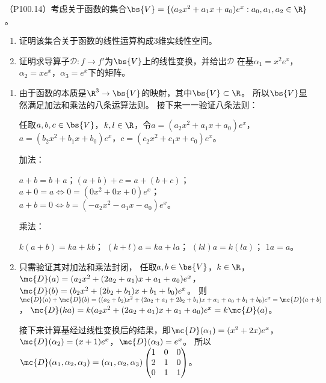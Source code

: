 \documentclass[12pt, a4paper, oneside, UTF8]{ctexbook}
\begin{document}
\begin{question}
    （P100.14）考虑关于函数的集合$\bs{V}=\{(a_2x^2+a_1x+a_0)e^x:a_0,a_1,a_2 \in \R\}$。
   \begin{enumerate}[label=(\arabic*)]
    \item 证明该集合关于函数的线性运算构成3维实线性空间。
    \item 证明求导算子$\mathcal{D}: f \rightarrow f'$为$\bs{V}$上的线性变换，并给出$\mathcal{D}$
    在基$\alpha_1=x^2e^x$，$\alpha_2=xe^x$，$\alpha_3=e^x$下的矩阵。
\end{enumerate}
\end{question}

\begin{solution}
    \begin{enumerate}[label=(\arabic*)]
        \item 由于函数的本质是$\R^3 \to \bs{V}$的映射，其中$\bs{V} \subset \R$。
        所以$\bs{V}$显然满足加法和乘法的八条运算法则。
        接下来一一验证八条法则：

        任取$a,b,c \in \bs{V}$，$k,l \in \R$，令$a=(a_2x^2+a_1x+a_0)e^x$，$a=(b_2x^2+b_1x+b_0)e^x$，$c=(c_2x^2+c_1x+c_0)e^x$。
        
        加法：

        $a+b=b+a$；$(a+b)+c=a+(b+c)$；
        $a+0=a \Leftrightarrow 0=(0x^2+0x+0)e^x$；
        $a+b=0 \Leftrightarrow b=(-a_2x^2-a_1x-a_0)e^x$。
        
        乘法：

        $k(a+b)=ka+kb$；
        $(k+l)a=ka+la$；
        $(kl)a=k(la)$；
        $1a=a$。
        
        \item 只需验证其对加法和乘法封闭，
        任取$a,b \in \bs{V}$，$k \in \R$，
        $\mc{D}(a)=(a_2x^2+(2a_2+a_1)x+a_1+a_0)e^x$，$\mc{D}(b)=(b_2x^2+(2b_2+b_1)x+b_1+b_0)e^x$。
        则$\mc{D}(a)+\mc{D}(b)=((a_2+b_2)x^2+(2a_2+a_1+2b_2+b_1)x+a_1+a_0+b_1+b_0)e^x=\mc{D}(a+b)$，
        $\mc{D}(ka)=k(a_2x^2+(2a_2+a_1)x+a_1+a_0)e^x=k\mc{D}(a)$。

        接下来计算基经过线性变换后的结果，即$\mc{D}(\alpha_1)=(x^2+2x)e^x$，$\mc{D}(\alpha_2)=(x+1)e^x$，$\mc{D}(\alpha_3)=e^x$。
        所以$\mc{D}(\alpha_1,\alpha_2,\alpha_3)=(\alpha_1,\alpha_2,\alpha_3)\begin{pmatrix}
            1 & 0 & 0\\
            2 & 1 & 0 \\
            0 & 1 & 1
        \end{pmatrix}$。
    \end{enumerate}
\end{solution}
\end{document}
